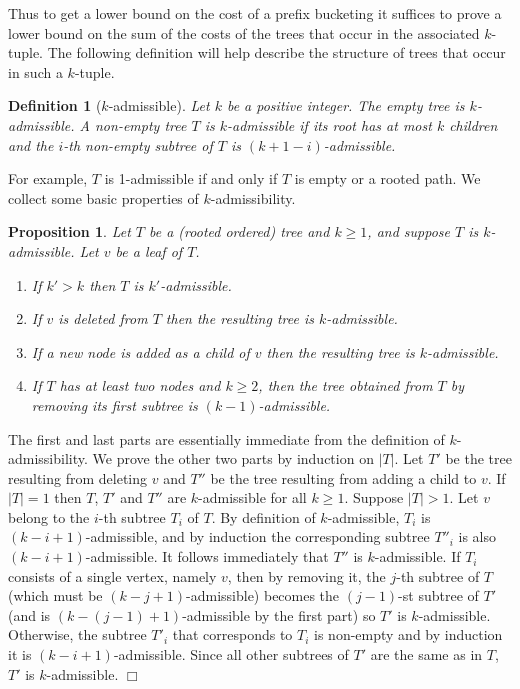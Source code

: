 \documentclass[11pt]{article}
\newtheorem{definition}[theorem]{Definition}
\newtheorem{proposition}[theorem]{Proposition}
\newcommand{\qed}{$\Box$}
\newenvironment{proof}{\noindent {\bf Proof:}}{\hfill \qed \smallskip}
\begin{document}
Thus to get a lower bound on the cost of a prefix bucketing 
it suffices to prove a lower bound on the sum of the costs of
the trees that occur in the associated $k$-tuple. 
The following definition will help describe the structure of
trees that occur in such a $k$-tuple.
 
\begin{definition}[$k$-admissible]
\label{def:k-admissibility}
Let $k$ be a positive integer. 
The empty tree is $k$-admissible. A non-empty tree $T$ is $k$-admissible if its root has at most $k$ children
and the $i$-th non-empty subtree of $T$ is $(k+1-i)$-admissible. 
\end{definition}

For example, $T$ is 1-admissible if and only if $T$ is empty or a rooted path.
We collect some basic properties of $k$-admissibility.

\begin{proposition}
\label{lm:k-admissibility}
Let $T$ be a (rooted ordered) tree and $k \geq 1$, and suppose $T$ is $k$-admissible. Let $v$ be a leaf of $T$.
\begin{enumerate}
\item If  $k' > k$ then $T$ is $k'$-admissible.
\item If $v$ is deleted from $T$ then the resulting tree  is  $k$-admissible. 
\item If a new node is added as a child of $v$  then the resulting tree is $k$-admissible.
\item  If $T$ has at least two nodes and $k \geq 2$, 
then the tree obtained from $T$ by removing its first subtree is $(k-1)$-admissible.
\end{enumerate}
\end{proposition}
\begin{proof}
The first and last parts are essentially immediate from the definition of $k$-admissibility.
We prove the other two parts by induction on $|T|$. 
 Let $T'$ be the tree resulting from deleting $v$
and $T''$ be the tree resulting from adding a child to $v$.  If $|T|=1$ then  $T$, $T'$ and $T''$
are $k$-admissible for all $k \geq 1$.
Suppose $|T| > 1$.  Let $v$ belong to the $i$-th subtree $T_i$ of $T$.
By definition of $k$-admissible, $T_i$ is $(k-i+1)$-admissible, and by induction the corresponding
subtree $T''_i$ is also $(k-i+1)$-admissible.  It follows immediately that $T''$ is $k$-admissible.
If $T_i$ consists of a single vertex, namely $v$, then by removing it, the $j$-th subtree
of $T$ (which must be $(k-j+1)$-admissible) becomes the $(j-1)$-st subtree of $T'$ (and is $(k-(j-1)+1)$-admissible 
by the first part) so $T'$ is $k$-admissible. Otherwise, the subtree $T'_i$ that corresponds to $T_i$ is non-empty and 
by induction it is $(k-i+1)$-admissible. Since all other subtrees of $T'$ are the same as in $T$, $T'$ is $k$-admissible.
\end{proof}
\end{document}
